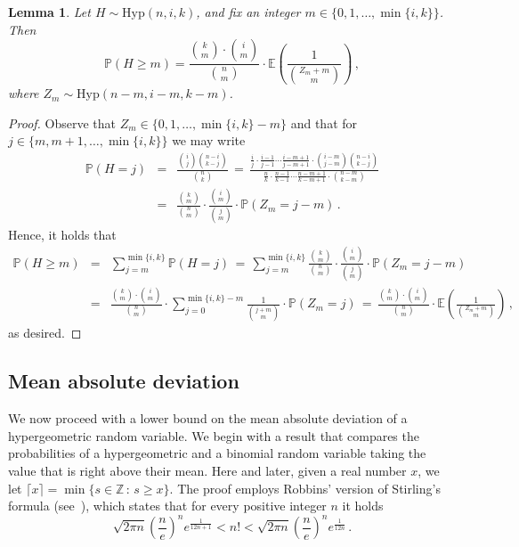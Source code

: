 \documentclass[10pt]{article}
\theoremstyle{plain}
\newtheorem{lemma}[theorem]{Lemma}
\theoremstyle{definition}
\theoremstyle{remark}
\begin{document}
\begin{lemma}\label{clean_form}
Let $H\sim\text{Hyp}(n,i,k)$, 
and fix an integer $m\in \{0,1,\ldots,\min\{i,k\}\}$. 
Then 
\begin{equation}\label{clean_form1}
\mathbb{P}(H \ge m) = \frac{\binom{k}{m}\cdot \binom{i}{m}}{\binom{n}{m}} \cdot \mathbb{E}\left(\frac{1}{\binom{Z_m+m}{m}} \right) \, ,
\end{equation}
where $Z_m\sim\text{Hyp}(n-m,i-m,k-m)$. 
\end{lemma}
\begin{proof}
Observe that 
$Z_m\in\{0,1,\ldots,\min\{i,k\}-m\}$ and that  for $j \in \{m,m+1,\ldots, \min\{i,k\}\}$ we may write  
\begin{eqnarray*}
\mathbb{P}(H = j) &=& \frac{\binom{i}{j}\binom{n-i}{k-j}}{\binom{n}{k}} 
\,=\, \frac{\frac{i}{j}\cdot\frac{i-1}{j-1}\cdots\frac{i-m+1}{j-m+1} \cdot \binom{i-m}{j-m}\binom{n-i}{k-j}}{\frac{n}{k}\cdot \frac{n-1}{k-1}\cdots \frac{n-m+1}{k-m+1}\cdot\binom{n-m}{k-m}} \\
&=& \frac{\binom{k}{m}}{\binom{n}{m}} \cdot\frac{\binom{i}{m}}{\binom{j}{m}} \cdot \mathbb{P}(Z_m = j-m) \, .
\end{eqnarray*}
Hence, it holds that   
\begin{eqnarray*}
\mathbb{P}(H \ge m) &=& \sum_{j=m}^{\min\{i,k\}} \mathbb{P}(H = j) 
\,=\, \sum_{j=m}^{\min\{i,k\}} \frac{\binom{k}{m}}{\binom{n}{m}} \cdot\frac{\binom{i}{m}}{\binom{j}{m}} \cdot \mathbb{P}(Z_m = j-m) \\
&=& \frac{\binom{k}{m} \cdot \binom{i}{m}}{\binom{n}{m}}  \cdot \sum_{j=0}^{\min\{i,k\}-m} \frac{1}{\binom{j+m}{m}} \cdot \mathbb{P}(Z_m = j) 
\,=\, \frac{\binom{k}{m} \cdot \binom{i}{m}}{\binom{n}{m}} \cdot \mathbb{E}\left(\frac{1}{\binom{Z_m+m}{m}}\right) \, ,
\end{eqnarray*}
as desired. 
\end{proof}


\subsection{Mean absolute deviation}
\label{hyp_dist2}

We now proceed with a lower bound on the mean absolute deviation of a hypergeometric random variable. We begin with a result that compares the probabilities of a hypergeometric and a binomial random variable taking the value that is right above their mean.  Here and later, given a real number $x$, we let $\lceil x \rceil=\min\{s\in\mathbb{Z}\,:\, s\ge x\}$. 
The proof employs Robbins' version of Stirling's formula (see~\cite{Robbins}), which states that for every positive integer $n$ it holds 
\begin{equation}\label{robbins_form}
\sqrt{2\pi n} \left(\frac{n}{e}\right)^n e^{\frac{1}{12n+1}} < n! < \sqrt{2\pi n} \left(\frac{n}{e}\right)^n e^{\frac{1}{12n}} \, .
\end{equation}
\end{document}
